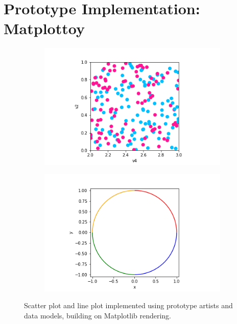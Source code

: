 \documentclass[../main.tex]{subfiles}
\begin{document}
\section{Prototype Implementation: Matplottoy}
\label{sec:implementation}
\begin{figure}[H]
    \begin{subfigure}{0.5\textwidth}
        \includegraphics[width=\textwidth]{figures/code/scatter_0.png}
    \end{subfigure}
    \begin{subfigure}{0.5\textwidth}
        \includegraphics[width=\textwidth]{figures/code/line_1.png}
    \end{subfigure}
    \caption{Scatter plot and line plot implemented using prototype artists and data models, building on Matplotlib rendering. }
    \label{fig:code_scatter_line}
\end{figure}
\end{document}
